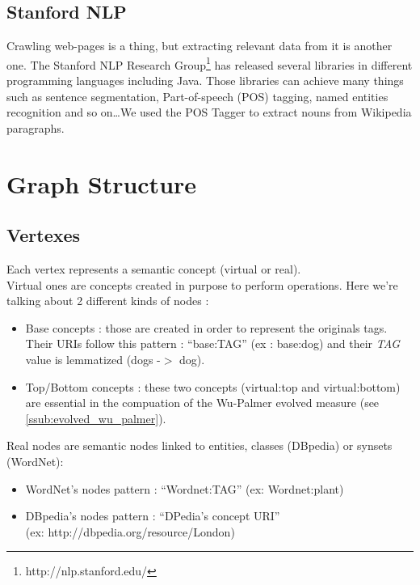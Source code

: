 \subsection{Stanford NLP}
Crawling web-pages is a thing, but extracting relevant data from it is another one. The Stanford NLP Research Group\footnote{http://nlp.stanford.edu/} has released several libraries in different programming languages including Java. Those libraries can achieve many things such as sentence segmentation, Part-of-speech (POS) tagging, named entities recognition and so on\dots We used the POS Tagger to extract nouns from Wikipedia paragraphs.

\section{Graph Structure} %
\label{sec:graph_structure}

\subsection{Vertexes} %
\label{sub:vertexes}
Each vertex represents a semantic concept (virtual or real).\\
Virtual ones are concepts created in purpose to perform operations. Here we’re talking about 2 different kinds of nodes :
\begin{itemize}
	\item Base concepts : those are created in order to represent the originals tags. Their URIs follow this pattern : “base:TAG” (ex : base:dog) and their \emph{TAG} value is lemmatized (dogs -$>$ dog).
	\item Top/Bottom concepts : these two concepts (virtual:top and virtual:bottom) are essential in the compuation of the Wu-Palmer evolved measure (see \ref{ssub:evolved_wu_palmer}).
\end{itemize}
Real nodes are semantic nodes linked to entities, classes (DBpedia) or synsets (WordNet):
\begin{itemize}
	\item WordNet's nodes pattern : “Wordnet:TAG” (ex: Wordnet:plant)
	\item DBpedia's nodes pattern : “DPedia’s concept URI”\\(ex: http://dbpedia.org/resource/London)
\end{itemize}

